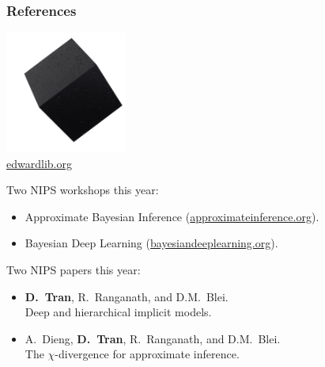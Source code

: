 \documentclass[10pt,
               xcolor={usenames,dvipsnames},
               hyperref={colorlinks,linktoc=all,citecolor=Plum,linkcolor=MidnightBlue,urlcolor=MidnightBlue},noamssymb]{beamer}
\begin{document}
\begin{frame}
\frametitle{References}
\begin{center}
\includegraphics[width=0.3\textwidth]{img/edward.png}
\\
\large \url{edwardlib.org}
\end{center}
\vspace{1ex}

Two NIPS workshops this year:
\begin{itemize}
\item
Approximate Bayesian Inference
(\url{approximateinference.org}).
\item
Bayesian Deep Learning
(\url{bayesiandeeplearning.org}).
\end{itemize}

Two NIPS papers this year:
\begin{itemize}
\item
\textbf{D.~Tran}, R.~Ranganath, and D.M.~Blei. \\
Deep and hierarchical implicit models. \\
\item
A.~Dieng, \textbf{D.~Tran}, R.~Ranganath, and D.M.~Blei. \\
The $\chi$-divergence for approximate inference. \\
\end{itemize}
\end{frame}
\end{document}
